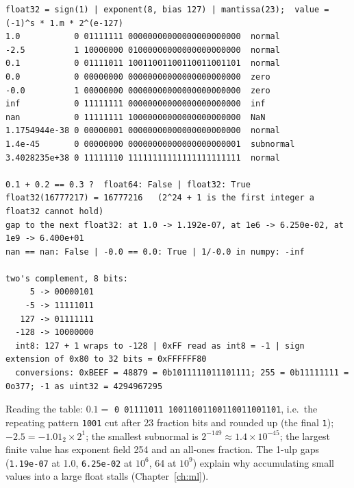 \documentclass[10pt,a4paper,openany,oneside]{report}
\begin{document}
\begin{lstlisting}[style=out,basicstyle=\ttfamily\fontsize{7.2}{8.6}\selectfont,title={Captured output}]
float32 = sign(1) | exponent(8, bias 127) | mantissa(23);  value = (-1)^s * 1.m * 2^(e-127)
1.0           0 01111111 00000000000000000000000  normal   
-2.5          1 10000000 01000000000000000000000  normal   
0.1           0 01111011 10011001100110011001101  normal   
0.0           0 00000000 00000000000000000000000  zero     
-0.0          1 00000000 00000000000000000000000  zero     
inf           0 11111111 00000000000000000000000  inf      
nan           0 11111111 10000000000000000000000  NaN      
1.1754944e-38 0 00000001 00000000000000000000000  normal   
1.4e-45       0 00000000 00000000000000000000001  subnormal
3.4028235e+38 0 11111110 11111111111111111111111  normal   

0.1 + 0.2 == 0.3 ?  float64: False | float32: True
float32(16777217) = 16777216   (2^24 + 1 is the first integer a float32 cannot hold)
gap to the next float32: at 1.0 -> 1.192e-07, at 1e6 -> 6.250e-02, at 1e9 -> 6.400e+01
nan == nan: False | -0.0 == 0.0: True | 1/-0.0 in numpy: -inf

two's complement, 8 bits:
     5 -> 00000101
    -5 -> 11111011
   127 -> 01111111
  -128 -> 10000000
  int8: 127 + 1 wraps to -128 | 0xFF read as int8 = -1 | sign extension of 0x80 to 32 bits = 0xFFFFFF80
  conversions: 0xBEEF = 48879 = 0b1011111011101111; 255 = 0b11111111 = 0o377; -1 as uint32 = 4294967295
\end{lstlisting}
Reading the table: $0.1=$ \texttt{0 01111011 10011001100110011001101}, i.e.\ the repeating pattern \texttt{1001} cut after 23 fraction bits and rounded up (the final \texttt{1}); $-2.5=-1.01_2\times2^{1}$; the smallest subnormal is $2^{-149}\approx1.4\times10^{-45}$; the largest finite value has exponent field 254 and an all-ones fraction. The 1-ulp gaps (\texttt{1.19e-07} at 1.0, \texttt{6.25e-02} at $10^6$, 64 at $10^9$) explain why accumulating small values into a large float stalls (Chapter~\ref{ch:ml}).
\end{document}
